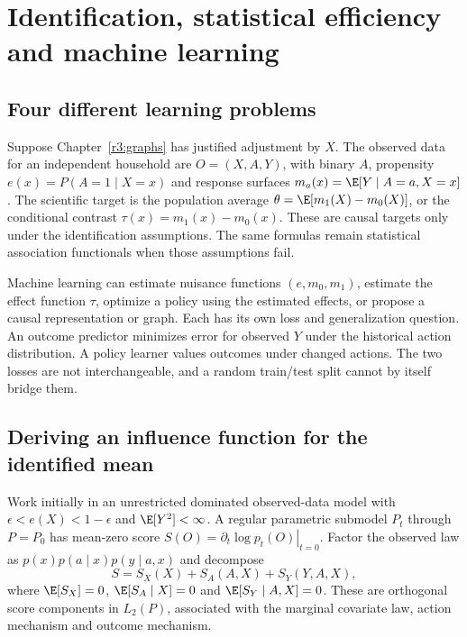 \chapter{Identification, statistical efficiency and machine learning}
\label{r3:learning}
\section{Four different learning problems}
Suppose Chapter~\ref{r3:graphs} has justified adjustment by $X$. The
observed data for an independent household are $O=(X,A,Y)$, with binary
$A$, propensity $e(x)=P(A=1\mid X=x)$ and response surfaces
$m_a(x)=\E[Y\mid A=a,X=x]$. The scientific target is the population
average $\theta=\E[m_1(X)-m_0(X)]$, or the conditional contrast
$\tau(x)=m_1(x)-m_0(x)$. These are causal targets only under the
identification assumptions. The same formulas remain statistical
association functionals when those assumptions fail.

Machine learning can estimate nuisance functions $(e,m_0,m_1)$, estimate
the effect function $\tau$, optimize a policy using the estimated effects,
or propose a causal representation or graph. Each has its own loss and
generalization question. An outcome predictor minimizes error for observed
$Y$ under the historical action distribution. A policy learner values
outcomes under changed actions. The two losses are not interchangeable,
and a random train/test split cannot by itself bridge them.

\section{Deriving an influence function for the identified mean}
\label{r3:influence}
Work initially in an unrestricted dominated observed-data model with
$\epsilon<e(X)<1-\epsilon$ and $\E[Y^2]<\infty$. A regular parametric
submodel $P_t$ through $P=P_0$ has mean-zero score
$S(O)=\left.\partial_t\log p_t(O)\right|_{t=0}$. Factor the observed
law as $p(x)p(a\mid x)p(y\mid a,x)$ and decompose
\[
 S=S_X(X)+S_A(A,X)+S_Y(Y,A,X),
\]
where $\E[S_X]=0$, $\E[S_A\mid X]=0$ and
$\E[S_Y\mid A,X]=0$. These are orthogonal score components in
$L_2(P)$, associated with the marginal covariate law, action mechanism
and outcome mechanism.

